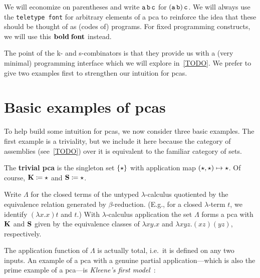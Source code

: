 \begin{notation}
  We will economize on parentheses and write \(\operatorname{\mathtt{a}}\operatorname{\mathtt{b}}\operatorname{\mathtt{c}}\) for
  \((\operatorname{\mathtt{a}}\operatorname{\mathtt{b}})\operatorname{\mathtt{c}}\).
  We will always use the \texttt{teletype font} for arbitrary elements of a pca
  to reinforce the idea that these should be thought of as (codes of) programs.
  For fixed programming constructs, we will use this \(\operatorname{\mathbf{bold\; font}}\)
  instead.
\end{notation}

The point of the k- and s-combinators is that they provide us with a (very
minimal) programming interface which we will explore in~\cref{TODO}.
%
We prefer to give two examples first to strengthen our intuition for pcas.

\section{Basic examples of pcas}

To help build some intuition for pcas, we now consider three basic examples. The
first example is a triviality, but we include it here because the category of
assemblies (see~\cref{TODO}) over it is equivalent to the familiar category of
sets.

\begin{example}
  The \textbf{trivial pca} is the singleton set \(\{\star\}\) with
  application map \((\star,\star) \mapsto \star\).
  Of course, \(\operatorname{\mathbf{K}} \coloneq \star\) and \(\operatorname{\mathbf{S}} \coloneq \star\).
\end{example}

\begin{example}
  Write \(\Lambda\) for the closed terms of the untyped \(\lambda\)-calculus
  quotiented by the equivalence relation generated by
  \(\beta\)-reduction. (E.g., for a closed \(\lambda\)-term \(t\), we identify
  \((\lambda{x}.{x})t\) and \(t\).)
  With \(\lambda\)-calculus application the set \(\Lambda\) forms a pca with
  \(\operatorname{\mathbf{K}}\) and \(\operatorname{\mathbf{S}}\) given by the equivalence classes of
  \(\lambda{xy}.x\) and \(\lambda{xyz}.(xz)(yz)\), respectively.
\end{example}

The application function of \(\Lambda\) is actually total, i.e.\ it is defined
on any two inputs. An example of a pca with a genuine partial application---which
is also the prime example of a pca---is \emph{Kleene's first model}~\cite{Kleene1945}:

